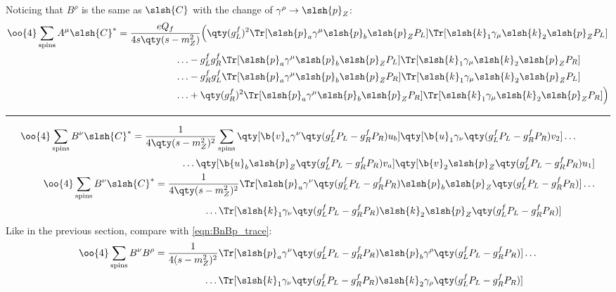 	Noticing that $B^\rho$ is the same as $\slsh{C}$ with the change of $\gamma^\rho\rightarrow\slsh{p}_Z$:
	\begin{align}
		\label{eqn:AmC_result}
		\begin{split}
			\oo{4}\sum_\text{spins}A^\mu \slsh{C}^*
			&=\frac{eQ_f}{4s\qty(s-m_Z^2)}
				\Big(
					\qty(g_L^f)^2
					\Tr[\slsh{p}_a\gamma^\mu \slsh{p}_b\slsh{p}_Z P_L]
					\Tr[\slsh{k}_1\gamma_\mu \slsh{k}_2\slsh{p}_Z P_L]
					\\
					&\qquad\qquad\qquad\ldots
					-g_L^fg_R^f
					\Tr[\slsh{p}_a\gamma^\mu \slsh{p}_b\slsh{p}_Z P_L]
					\Tr[\slsh{k}_1\gamma_\mu \slsh{k}_2\slsh{p}_Z P_R]
					\\
					&\qquad\qquad\qquad\ldots
					-g_R^fg_L^f
					\Tr[\slsh{p}_a\gamma^\mu \slsh{p}_b\slsh{p}_Z P_R]
					\Tr[\slsh{k}_1\gamma_\mu \slsh{k}_2\slsh{p}_Z P_L]
					\\
					&\qquad\qquad\qquad\ldots
					+\qty(g_R^f)^2
					\Tr[\slsh{p}_a\gamma^\mu \slsh{p}_b\slsh{p}_Z P_R]
					\Tr[\slsh{k}_1\gamma_\mu \slsh{k}_2\slsh{p}_Z P_R]
					\Big)
		\end{split}
	\end{align}
\hrule
	\begin{align}
		\begin{split}
			\oo{4}\sum_\text{spins}B^\nu\slsh{C}^*
			&=\frac{1}{4\qty(s-m_Z^2)^2}\sum_\text{spins}
			\qty[\b{v}_a\gamma^\nu\qty(g_L^fP_L-g_R^fP_R)u_b]
			\qty[\b{u}_1\gamma_\nu\qty(g_L^fP_L-g_R^fP_R)v_2]
			\ldots\\&\qquad\qquad\quad\ldots
			\qty[\b{u}_b\slsh{p}_Z\qty(g_L^fP_L-g_R^fP_R)v_a]
			\qty[\b{v}_2\slsh{p}_Z\qty(g_L^fP_L-g_R^fP_R)u_1]
		\end{split}
		\\
		\label{eqn:BnC_trace}
		\begin{split}
			\oo{4}\sum_\text{spins}B^\nu\slsh{C}^*
			&=\frac{1}{4\qty(s-m_Z^2)^2}
			\Tr[\slsh{p}_a\gamma^\nu\qty(g_L^fP_L-g_R^fP_R)\slsh{p}_b\slsh{p}_Z\qty(g_L^fP_L-g_R^fP_R)]
			\ldots\\&\qquad\qquad\quad\ldots
			\Tr[\slsh{k}_1\gamma_\nu\qty(g_L^fP_L-g_R^fP_R)\slsh{k}_2\slsh{p}_Z\qty(g_L^fP_L-g_R^fP_R)]
		\end{split}
	\end{align}
	Like in the previous section, compare with \ref{eqn:BnBp_trace}:
	\begin{align}
		\begin{split}
			\oo{4}\sum_\text{spins}B^\nu B^\rho&=
			\frac{1}{4(s-m_Z^2)^2}
			\Tr[\slsh{p}_a\gamma^\nu\qty(g_L^fP_L-g_R^fP_R)\slsh{p}_b\gamma^\rho\qty(g_L^fP_L-g_R^fP_R)]
			\ldots\\&\qquad\qquad\quad\ldots
			\Tr[\slsh{k}_1\gamma_\nu\qty(g_L^fP_L-g_R^fP_R)\slsh{k}_2\gamma_\rho\qty(g_L^fP_L-g_R^fP_R)]
		\end{split}
	\end{align}

